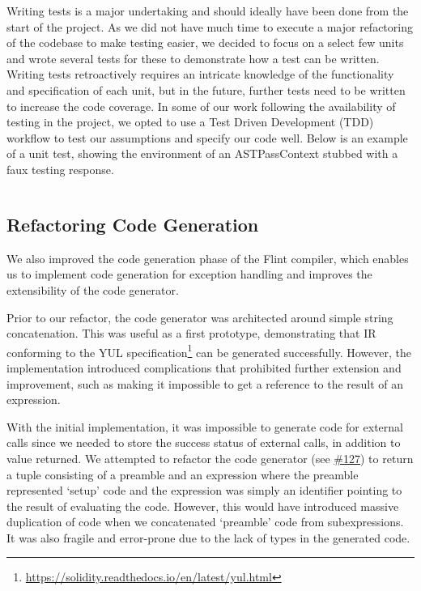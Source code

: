 Writing tests is a major undertaking and should ideally have been done from the start of the project. As we did not have much time to execute a major refactoring of the codebase to make testing easier, we decided to focus on a select few units and wrote several tests for these to demonstrate how a test can be written. Writing tests retroactively requires an intricate knowledge of the functionality and specification of each unit, but in the future, further tests need to be written to increase the code coverage. In some of our work following the availability of testing in the project, we opted to use a Test Driven Development (TDD) workflow to test our assumptions and specify our code well. Below is an example of a unit test, showing the environment of an ASTPassContext stubbed with a faux testing response.

\inputminted{swift}{code/unit-test.swift}

\subsection{Refactoring Code Generation}

We also improved the code generation phase of the Flint compiler, which enables us to implement code generation for exception handling and improves the extensibility of the code generator.

Prior to our refactor, the code generator was architected around simple string concatenation. This was useful as a first prototype, demonstrating that IR conforming to the YUL specification\footnote{\url{https://solidity.readthedocs.io/en/latest/yul.html}} can be generated successfully. However, the implementation introduced complications that prohibited further extension and improvement, such as making it impossible to get a reference to the result of an expression.

With the initial implementation, it was impossible to generate code for external calls since we needed to store the success status of external calls, in addition to value returned. We attempted to refactor the code generator (see \href{https://github.com/flintrocks/flint/pull/127}{\#127}) to return a tuple consisting of a preamble and an expression where the preamble represented ‘setup’ code and the expression was simply an identifier pointing to the result of evaluating the code. However, this would have introduced massive duplication of code when we concatenated ‘preamble’ code from subexpressions. It was also fragile and error-prone due to the lack of types in the generated code.

